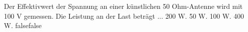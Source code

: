     {Der Effektivwert der Spannung an einer künstlichen 50 Ohm-Antenne wird mit 100 V gemessen. Die Leistung an der Last beträgt ...}
    {200 W.}
    {50 W.}
    {100 W.}
    {400 W.}
    {false}{false}